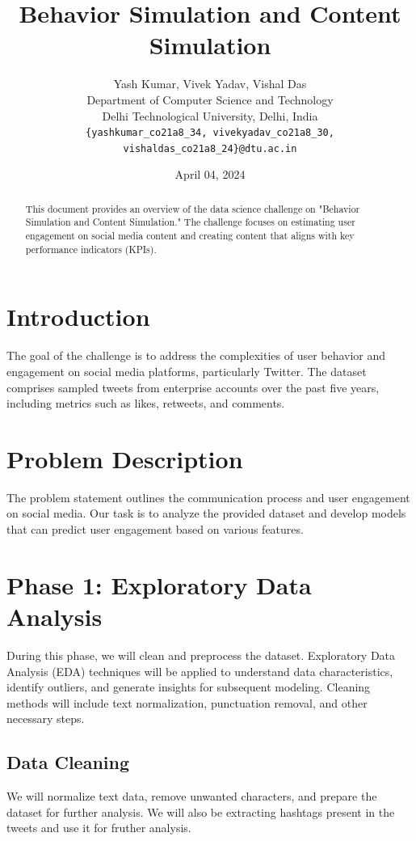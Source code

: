 \documentclass[11pt,a4paper]{article}
\title{Behavior Simulation and Content Simulation}
\author{Yash Kumar, Vivek Yadav, Vishal Das \\
  Department of Computer Science and Technology \\
  Delhi Technological University, Delhi, India \\
  {\tt \{yashkumar\_co21a8\_34, vivekyadav\_co21a8\_30, vishaldas\_co21a8\_24\}@dtu.ac.in}}
\date{April 04, 2024}
\begin{document}
\maketitle

\begin{abstract}
This document provides an overview of the data science challenge on "Behavior Simulation and Content Simulation." The challenge focuses on estimating user engagement on social media content and creating content that aligns with key performance indicators (KPIs).
\end{abstract}

\section{Introduction}
The goal of the challenge is to address the complexities of user behavior and engagement on social media platforms, particularly Twitter. The dataset comprises sampled tweets from enterprise accounts over the past five years, including metrics such as likes, retweets, and comments.

\section{Problem Description}
The problem statement outlines the communication process and user engagement on social media. Our task is to analyze the provided dataset and develop models that can predict user engagement based on various features.

\section{Phase 1: Exploratory Data Analysis}
During this phase, we will clean and preprocess the dataset. Exploratory Data Analysis (EDA) techniques will be applied to understand data characteristics, identify outliers, and generate insights for subsequent modeling. Cleaning methods will include text normalization, punctuation removal, and other necessary steps.

\subsection{Data Cleaning}
We will normalize text data, remove unwanted characters, and prepare the dataset for further analysis. We will also be extracting hashtags present in the tweets and use it for fruther analysis.
\end{document}
